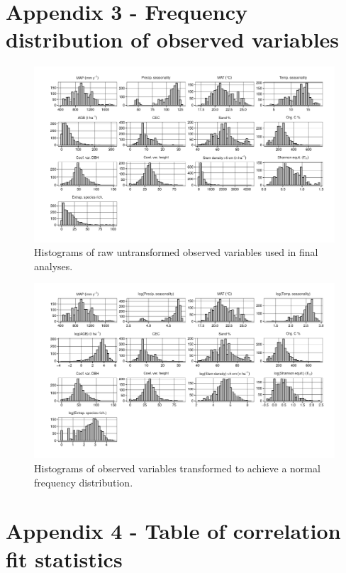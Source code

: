 \documentclass[11pt,a4paper]{article}
\begin{document}
\section*{Appendix 3 - Frequency distribution of observed variables} \label{appendixc}

\begin{figure}[H]
\centering
	\includegraphics[width=\textwidth]{histogram_raw_obs}
	\caption{Histograms of raw untransformed observed variables used in final analyses.}
	\label{histogram_raw_obs}
\end{figure}

\begin{figure}[H]
\centering
	\includegraphics[width=\textwidth]{histogram_trans_obs}
	\caption{Histograms of observed variables transformed to achieve a normal frequency distribution.}
	\label{histogram_trans_obs}
\end{figure}

\section*{Appendix 4 - Table of correlation fit statistics} \label{appendixd}


\end{document}

